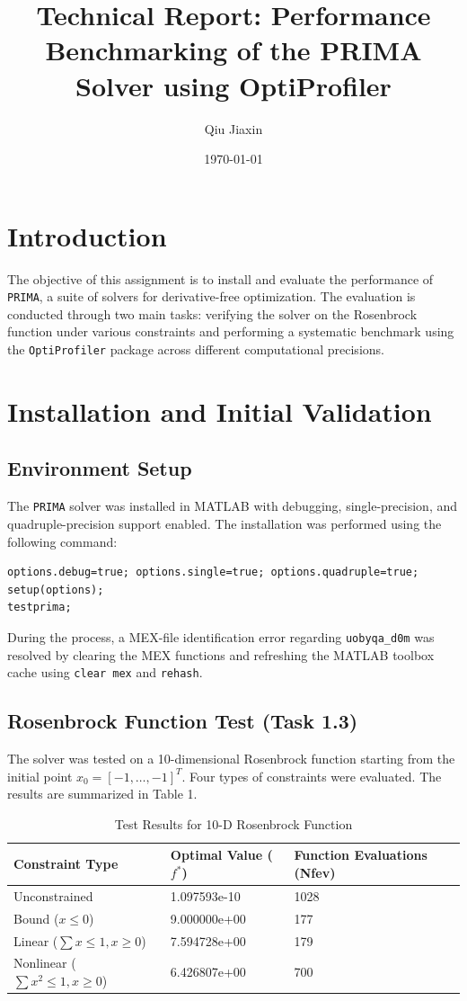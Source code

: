 \documentclass[12pt, a4paper]{article}
\title{Technical Report: Performance Benchmarking of the PRIMA Solver using OptiProfiler}
\author{Qiu Jiaxin}
\date{\today}
\begin{document}
\maketitle

\section{Introduction}
The objective of this assignment is to install and evaluate the performance of \texttt{PRIMA}, a suite of solvers for derivative-free optimization. The evaluation is conducted through two main tasks: verifying the solver on the Rosenbrock function under various constraints and performing a systematic benchmark using the \texttt{OptiProfiler} package across different computational precisions.

\section{Installation and Initial Validation}

\subsection{Environment Setup}
The \texttt{PRIMA} solver was installed in MATLAB with debugging, single-precision, and quadruple-precision support enabled. The installation was performed using the following command:
\begin{lstlisting}
options.debug=true; options.single=true; options.quadruple=true; 
setup(options); 
testprima;
\end{lstlisting}
During the process, a MEX-file identification error regarding \texttt{uobyqa\_d0m} was resolved by clearing the MEX functions and refreshing the MATLAB toolbox cache using \texttt{clear mex} and \texttt{rehash}.

\subsection{Rosenbrock Function Test (Task 1.3)}
The solver was tested on a 10-dimensional Rosenbrock function starting from the initial point $x_0 = [-1, \dots, -1]^T$. Four types of constraints were evaluated. The results are summarized in Table 1.

\begin{table}[h]
\centering
\caption{Test Results for 10-D Rosenbrock Function}
\begin{tabular}{@{}lll@{}}
\toprule
Constraint Type & Optimal Value ($f^*$) & Function Evaluations (Nfev) \\ \midrule
Unconstrained & 1.097593e-10 & 1028 \\
Bound ($x \le 0$) & 9.000000e+00 & 177 \\
Linear ($\sum x \le 1, x \ge 0$) & 7.594728e+00 & 179 \\
Nonlinear ($\sum x^2 \le 1, x \ge 0$) & 6.426807e+00 & 700 \\ \bottomrule
\end{tabular}
\end{table}
\end{document}
